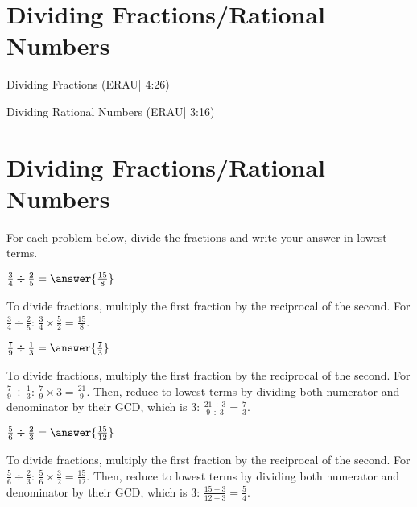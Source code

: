 \documentclass{ximera}
\begin{document}

\section*{Dividing Fractions/Rational Numbers}

Dividing Fractions (ERAU| 4:26)


Dividing Rational Numbers (ERAU| 3:16)



\section*{Dividing Fractions/Rational Numbers}

For each problem below, divide the fractions and write your answer in lowest terms.

\begin{problem}
$\frac{3}{4} \div \frac{2}{5} = \answer{\frac{15}{8}}$
\begin{feedback}
To divide fractions, multiply the first fraction by the reciprocal of the second. For $\frac{3}{4} \div \frac{2}{5}$: $\frac{3}{4} \times \frac{5}{2} = \frac{15}{8}$.
\end{feedback}
\end{problem}

\begin{problem}
$\frac{7}{9} \div \frac{1}{3} = \answer{\frac{7}{3}}$
\begin{feedback}
To divide fractions, multiply the first fraction by the reciprocal of the second. For $\frac{7}{9} \div \frac{1}{3}$: $\frac{7}{9} \times 3 = \frac{21}{9}$. Then, reduce to lowest terms by dividing both numerator and denominator by their GCD, which is $3$: $\frac{21 \div 3}{9 \div 3} = \frac{7}{3}$.
\end{feedback}
\end{problem}

\begin{problem}
$\frac{5}{6} \div \frac{2}{3} = \answer{\frac{15}{12}}$
\begin{feedback}
To divide fractions, multiply the first fraction by the reciprocal of the second. For $\frac{5}{6} \div \frac{2}{3}$: $\frac{5}{6} \times \frac{3}{2} = \frac{15}{12}$. Then, reduce to lowest terms by dividing both numerator and denominator by their GCD, which is $3$: $\frac{15 \div 3}{12 \div 3} = \frac{5}{4}$.
\end{feedback}
\end{problem}
\end{document}
